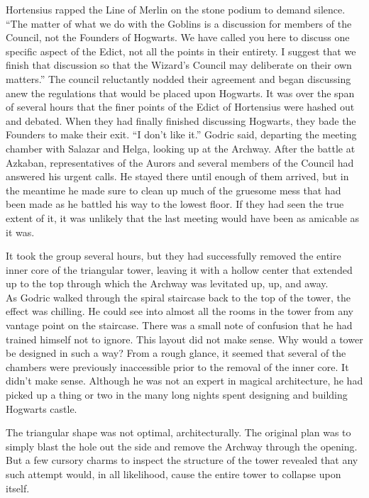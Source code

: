 Hortensius rapped the Line of Merlin on the stone podium to demand silence. “The matter of what we do with the Goblins is a discussion for members of the Council, not the Founders of Hogwarts. We have called you here to discuss one specific aspect of the Edict, not all the points in their entirety. I suggest that we finish that discussion so that the Wizard’s Council may deliberate on their own matters.”
\SmallVSpace
The council reluctantly nodded their agreement and began discussing anew the regulations that would be placed upon Hogwarts. It was over the span of several hours that the finer points of the Edict of Hortensius were hashed out and debated. When they had finally finished discussing Hogwarts, they bade the Founders to make their exit.
\simpleline
“I don’t like it.” Godric said, departing the meeting chamber with Salazar and Helga, looking up at the Archway. After the battle at Azkaban, representatives of the Aurors and several members of the Council had answered his urgent calls. He stayed there until enough of them arrived, but in the meantime he made sure to clean up much of the gruesome mess that had been made as he battled his way to the lowest floor. If they had seen the true extent of it, it was unlikely that the last meeting would have been as amicable as it was.

It took the group several hours, but they had successfully removed the entire inner core of the triangular tower, leaving it with a hollow center that extended up to the top through which the Archway was levitated up, up, and away.\\As Godric walked through the spiral staircase back to the top of the tower, the effect was chilling. He could see into almost all the rooms in the tower from any vantage point on the staircase.
\SmallVSpace
There was a small note of confusion that he had trained himself not to ignore. This layout did not make sense. Why would a tower be designed in such a way? From a rough glance, it seemed that several of the chambers were previously inaccessible prior to the removal of the inner core. It didn’t make sense. Although he was not an expert in magical architecture, he had picked up a thing or two in the many long nights spent designing and building Hogwarts castle.

The triangular shape was not optimal, architecturally. The original plan was to simply blast the hole out the side and remove the Archway through the opening. But a few cursory charms to inspect the structure of the tower revealed that any such attempt would, in all likelihood, cause the entire tower to collapse upon itself.

